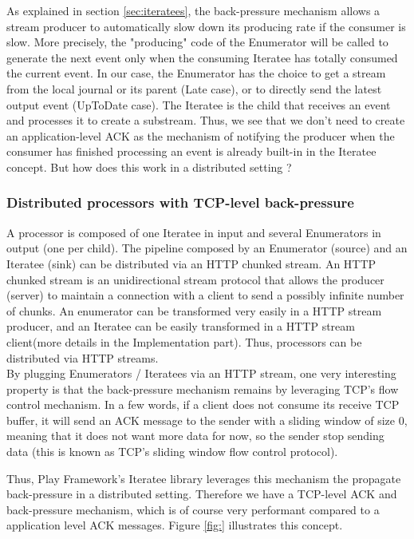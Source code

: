 As explained in section \ref{sec:iteratees}, the back-pressure mechanism allows a stream producer to automatically slow down its producing rate if the consumer is slow. 
More precisely, the "producing" code of the Enumerator will be called to generate the next event only when the consuming Iteratee has totally consumed the current event.
In our case, the Enumerator has the choice to get a stream from the local journal or its parent (Late case), or to directly send the latest output event (UpToDate case).
The Iteratee is the child that receives an event and processes it to create a substream.
Thus, we see that we don't need to create an application-level ACK as the mechanism of notifying the producer when the consumer has finished processing an event is already
built-in in the Iteratee concept. But how does this work in a distributed setting ?


\subsubsection{Distributed processors with TCP-level back-pressure}

A processor is composed of one Iteratee in input and several Enumerators in output (one per child). The pipeline composed by an Enumerator (source) and an Iteratee (sink) can
be distributed via an HTTP chunked stream. An HTTP chunked stream is an unidirectional stream protocol that allows the producer (server) to maintain a connection with a client to send a possibly infinite number of chunks. An enumerator can be transformed very easily in a HTTP stream producer, and an Iteratee can be easily transformed in a HTTP stream client(more details in the Implementation part). Thus, processors can be distributed via HTTP streams.
\\

By plugging Enumerators / Iteratees via an HTTP stream, one very interesting property is that the back-pressure mechanism remains by leveraging TCP's flow control mechanism. In a few words, if a client does not consume its receive TCP buffer, it will send an ACK message to the sender with a sliding window of size 0, meaning that it does not want more data for now, so the sender stop sending data (this is known as TCP's sliding window flow control protocol).

Thus, Play Framework's Iteratee library leverages this mechanism the propagate back-pressure in a distributed setting. Therefore we have a TCP-level ACK and back-pressure mechanism, which is of course very performant compared to a application level ACK messages. Figure \ref{fig:} illustrates this concept.


